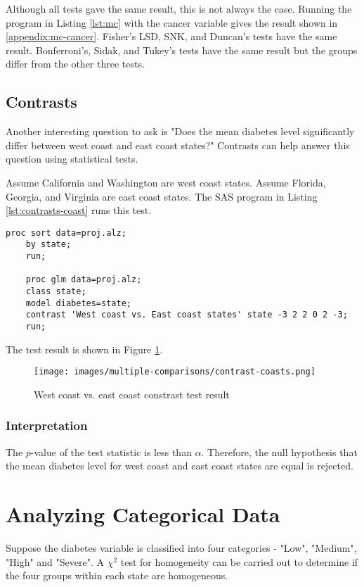 \documentclass{article}
\begin{document}
Although all tests gave the same result, this is not always the case. Running the program in Listing \ref{lst:mc} with the cancer variable gives the result shown in \ref{appendix:mc-cancer}. Fisher's LSD, SNK, and Duncan's tests have the same result. Bonferroni's, Sidak, and Tukey's tests have the same result but the groups differ from the other three tests.

\subsection{Contrasts}
Another interesting question to ask is "Does the mean diabetes level significantly differ between west coast and east coast states?" Contrasts can help answer this question using statistical tests.

Assume California and Washington are west coast states. Assume Florida, Georgia, and Virginia are east coast states. The SAS program in Listing \ref{lst:contrasts-coast} runs this test.

\begin{lstlisting}[language=SAS,caption=Contrast SAS program comparing west coast and east coast states,captionpos=b,label=lst:contrasts-coast]
    proc sort data=proj.alz;
    by state;
    run;
    
    proc glm data=proj.alz;
    class state;
    model diabetes=state;
    contrast 'West coast vs. East coast states' state -3 2 2 0 2 -3;
    run;
\end{lstlisting}

The test result is shown in Figure \ref{fig:mc-coast-result}.

\begin{figure}[ht]
    \centering
    \texttt{[image: images/multiple-comparisons/contrast-coasts.png]}
    \caption{West coast vs. east coast constrast test result}
    \label{fig:mc-coast-result}
\end{figure}

\subsubsection{Interpretation}
The $p$-value of the test statistic is less than $\alpha$. Therefore, the null hypothesis that the mean diabetes level for west coast and east coast states are equal is rejected.

\section{Analyzing Categorical Data}
Suppose the diabetes variable is classified into four categories - "Low", "Medium", "High" and "Severe". A $\chi^2$ test for homogeneity can be carried out to determine if the four groups within each state are homogeneous.
\end{document}

